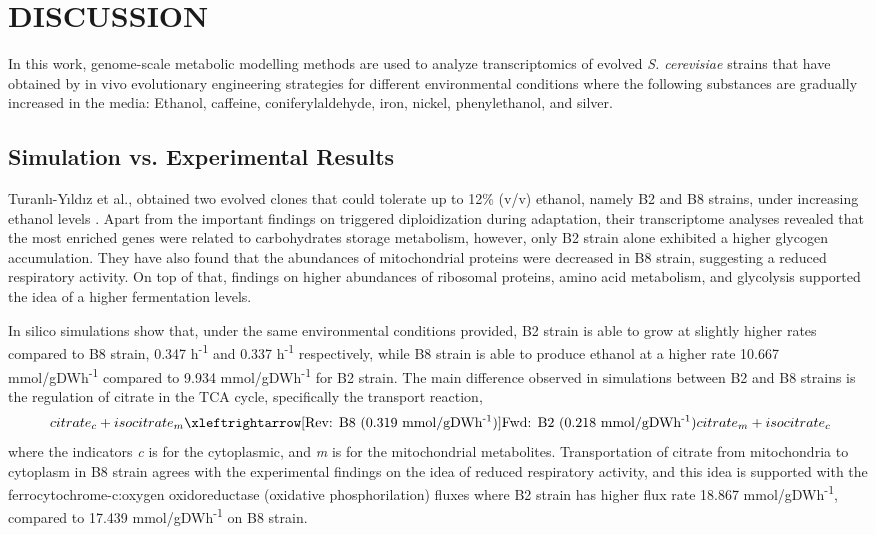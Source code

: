 \chapter{DISCUSSION}

In this work, genome-scale metabolic modelling methods are used to analyze transcriptomics of evolved \emph{S. cerevisiae} strains that have obtained by in vivo evolutionary engineering strategies for different environmental conditions where the following substances are gradually increased in the media: Ethanol, caffeine, coniferylaldehyde, iron, nickel, phenylethanol, and silver.

\section{Simulation vs. Experimental Results}
Turanlı-Yıldız et al., obtained two evolved clones that could tolerate up to 12\% (v/v) ethanol, namely B2 and B8 strains, under increasing ethanol levels \cite{TuranlYldz2017}. Apart from the important findings on triggered diploidization during adaptation, their transcriptome analyses revealed that the most enriched genes were related to carbohydrates storage metabolism, however, only B2 strain alone exhibited a higher glycogen accumulation. They have also found that the abundances of mitochondrial proteins were decreased in B8 strain, suggesting a reduced respiratory activity. On top of that, findings on higher abundances of ribosomal proteins, amino acid metabolism, and glycolysis supported the idea of a higher fermentation levels.

In silico simulations show that, under the same environmental conditions provided, B2 strain is able to grow at slightly higher rates compared to B8 strain, 0.347 h\textsuperscript{-1} and 0.337 h\textsuperscript{-1} respectively, while B8 strain is able to produce ethanol at a higher rate 10.667 mmol/gDWh\textsuperscript{-1} compared to 9.934 mmol/gDWh\textsuperscript{-1} for B2 strain. The main difference observed in simulations between B2 and B8 strains is the regulation of citrate in the TCA cycle, specifically the transport reaction,
\begin{align}
\label{eq:citratetransport}
\ citrate_c + isocitrate_m \xleftrightarrow[\text{Rev: B8 (0.319 mmol/gDWh\textsuperscript{-1})}]{\text{Fwd: B2 (0.218 mmol/gDWh\textsuperscript{-1})}} citrate_m + isocitrate_c
\end{align}
\noindent where the indicators \emph{c} is for the cytoplasmic, and \emph{m} is for the mitochondrial metabolites. Transportation of citrate from mitochondria to cytoplasm in B8 strain agrees with the experimental findings on the idea of reduced respiratory activity, and this idea is supported with the ferrocytochrome-c:oxygen oxidoreductase (oxidative phosphorilation) fluxes where B2 strain has higher flux rate 18.867 mmol/gDWh\textsuperscript{-1}, compared to 17.439 mmol/gDWh\textsuperscript{-1} on B8 strain.

